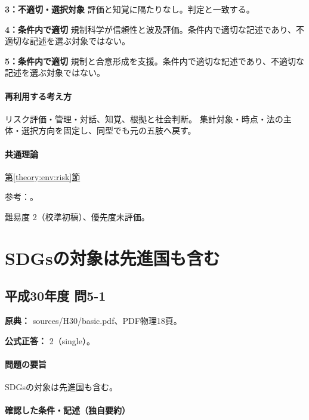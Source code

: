 \noindent\textbf{3：不適切・選択対象} 評価と知覚に隔たりなし。判定と一致する。\par

\noindent\textbf{4：条件内で適切} 規制科学が信頼性と波及評価。条件内で適切な記述であり、不適切な記述を選ぶ対象ではない。\par

\noindent\textbf{5：条件内で適切} 規制と合意形成を支援。条件内で適切な記述であり、不適切な記述を選ぶ対象ではない。\par

\paragraph{再利用する考え方} リスク評価・管理・対話、知覚、根拠と社会判断。 集計対象・時点・法の主体・選択方向を固定し、同型でも元の五肢へ戻す。

\paragraph{共通理論} \hyperref[theory:env:risk]{第\ref*{theory:env:risk}節}

\par 参考：\cite{eth54_riskcomm}。

\par 難易度 2（校準初稿）、優先度未評価。

\section{SDGsの対象は先進国も含む}

\subsection{平成30年度 問5-1}
\label{q:h30-reg-basic-5-1}

\noindent\textbf{原典：} sources/H30/basic.pdf、PDF物理18頁。

\textbf{公式正答：} 2（single）。

\paragraph{問題の要旨} SDGsの対象は先進国も含む。

\paragraph{確認した条件・記述（独自要約）}\mbox{}\par

